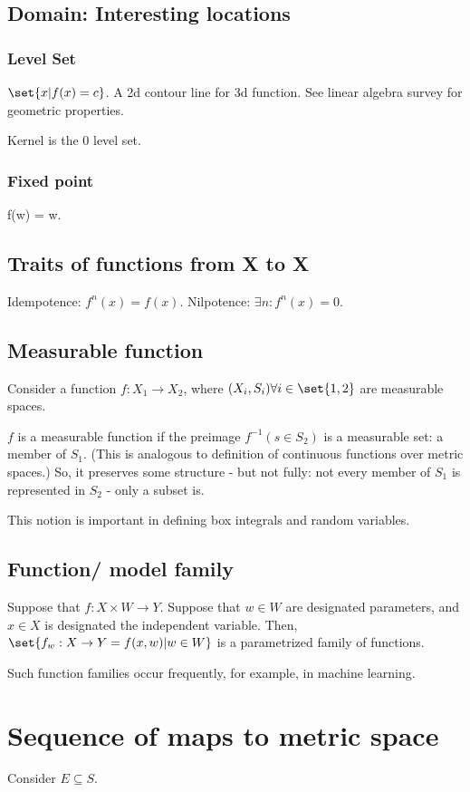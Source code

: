 \documentclass[oneside, article]{memoir}
\begin{document}
\subsection{Domain: Interesting locations}
\subsubsection{Level Set}
$\set{x | f(x) = c}$. A 2d contour line for 3d function. See linear algebra survey for geometric properties.

Kernel is the 0 level set.

\subsubsection{Fixed point}
f(w) = w.

\subsection{Traits of functions from X to X}
Idempotence: $f^{n}(x) = f(x)$. Nilpotence: $\exists n: f^{n}(x) = 0$.

\subsection{Measurable function}
Consider a function $f: X_1 \to X_2$, where $(X_i, S_i) \forall i \in \set{1, 2}$ are measurable spaces.

$f$ is a measurable function if the preimage $f^{-1}(s \in S_2)$ is a measurable set: a member of $S_1$. (This is analogous to definition of continuous functions over metric spaces.) So, it preserves some structure - but not fully: not every member of $S_1$ is represented in $S_2$ - only a subset is.

This notion is important in defining box integrals and random variables.

\subsection{Function/ model family}
Suppose that $f:X \times W \to Y$. Suppose that $w \in W$ are designated parameters, and $x \in X$ is designated the independent variable. Then, \\$\set{f_w:X \to Y = f(x, w)| w \in W}$ is a parametrized family of functions.

Such function families occur frequently, for example, in machine learning.

\section{Sequence of maps to metric space}
Consider $E \subseteq S$.
\end{document}
